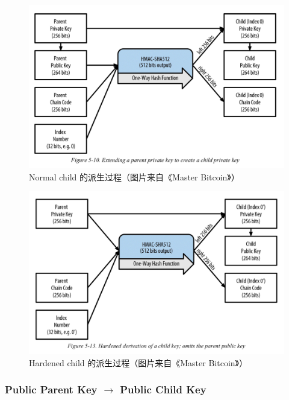 \begin{figure}[h]
\centering
\includegraphics[width=\textwidth]{./CKDpriv.png}
\caption{Normal child 的派生过程（图片来自《Master Bitcoin》）}\label{fig-parsesig}
\end{figure}


\begin{figure}[h]
\centering
\includegraphics[width=\textwidth]{./CKDpriv2.png}
\caption{Hardened child 的派生过程（图片来自《Master Bitcoin》）}\label{fig-parsesig}
\end{figure}



\subsubsection{Public Parent Key $\rightarrow$ Public Child Key}

